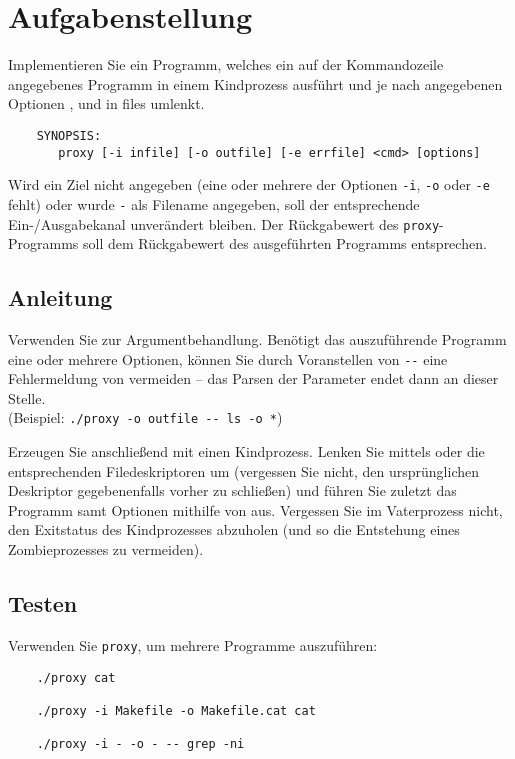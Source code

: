 




\section*{Aufgabenstellung}

Implementieren Sie ein Programm, welches ein auf der Kommandozeile angegebenes
Programm in einem Kindprozess ausführt und je nach angegebenen Optionen 
,  und  in files umlenkt.

\begin{verbatim}
    SYNOPSIS:
       proxy [-i infile] [-o outfile] [-e errfile] <cmd> [options]
\end{verbatim}

Wird ein Ziel nicht angegeben (eine oder mehrere der Optionen \verb_-i_,
\verb_-o_ oder \verb_-e_ fehlt) oder wurde \verb_-_ als Filename angegeben, soll
der entsprechende Ein-/Ausgabekanal unverändert bleiben. Der Rückgabewert des
\verb_proxy_-Programms soll dem Rückgabewert des ausgeführten Programms
entsprechen.

\subsection*{Anleitung}

Verwenden Sie  zur Argumentbehandlung. Benötigt das
auszuführende Programm eine oder mehrere Optionen, können Sie durch Voranstellen
von \verb|--| eine Fehlermeldung von  vermeiden – das Parsen der
Parameter endet dann an dieser Stelle.\\
(Beispiel: \verb|./proxy -o outfile -- ls -o *|)

Erzeugen Sie anschließend mit  einen Kindprozess. Lenken Sie
mittels  oder  die entsprechenden Filedeskriptoren um
(vergessen Sie nicht, den ursprünglichen Deskriptor gegebenenfalls vorher zu
schließen) und führen Sie zuletzt das Programm samt Optionen mithilfe von
 aus. Vergessen Sie im Vaterprozess nicht, den Exitstatus des
Kindprozesses abzuholen (und so die Entstehung eines Zombieprozesses zu
vermeiden).

\subsection*{Testen}

Verwenden Sie \verb_proxy_, um mehrere Programme auszuführen:

\begin{verbatim}
	./proxy cat
	
	./proxy -i Makefile -o Makefile.cat cat

	./proxy -i - -o - -- grep -ni
\end{verbatim}

\osueguidelinestwo


